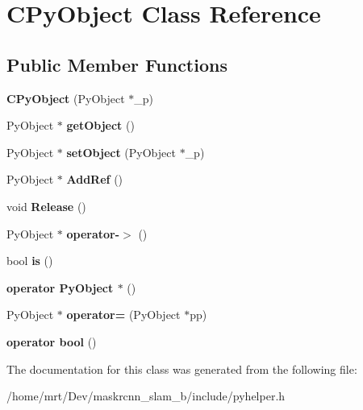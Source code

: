 \hypertarget{classCPyObject}{}\section{C\+Py\+Object Class Reference}
\label{classCPyObject}
\subsection*{Public Member Functions}
\begin{DoxyCompactItemize}
\item 
{\bfseries C\+Py\+Object} (Py\+Object $\ast$\+\_\+p)\hypertarget{classCPyObject_ab0879ae04f36d0c2bde91fac93172f0d}{}\label{classCPyObject_ab0879ae04f36d0c2bde91fac93172f0d}

\item 
Py\+Object $\ast$ {\bfseries get\+Object} ()\hypertarget{classCPyObject_a3f66c0af575875b43705836d435cfca2}{}\label{classCPyObject_a3f66c0af575875b43705836d435cfca2}

\item 
Py\+Object $\ast$ {\bfseries set\+Object} (Py\+Object $\ast$\+\_\+p)\hypertarget{classCPyObject_a2076d0dedf1eaa03f4c8e3732d0eb784}{}\label{classCPyObject_a2076d0dedf1eaa03f4c8e3732d0eb784}

\item 
Py\+Object $\ast$ {\bfseries Add\+Ref} ()\hypertarget{classCPyObject_a7ef6b0d76d997a997f8ef52ece7b2032}{}\label{classCPyObject_a7ef6b0d76d997a997f8ef52ece7b2032}

\item 
void {\bfseries Release} ()\hypertarget{classCPyObject_af10eb4a211c489f7cbdf3ead1ae54502}{}\label{classCPyObject_af10eb4a211c489f7cbdf3ead1ae54502}

\item 
Py\+Object $\ast$ {\bfseries operator-\/$>$} ()\hypertarget{classCPyObject_a16862e32d5a8cf461627a92bfbccca56}{}\label{classCPyObject_a16862e32d5a8cf461627a92bfbccca56}

\item 
bool {\bfseries is} ()\hypertarget{classCPyObject_a5194ed03c277782e2de122aaaf44111f}{}\label{classCPyObject_a5194ed03c277782e2de122aaaf44111f}

\item 
{\bfseries operator Py\+Object $\ast$} ()\hypertarget{classCPyObject_acbf3d2c5d9a611f9afff168df4f6de4c}{}\label{classCPyObject_acbf3d2c5d9a611f9afff168df4f6de4c}

\item 
Py\+Object $\ast$ {\bfseries operator=} (Py\+Object $\ast$pp)\hypertarget{classCPyObject_a1ad4db3b7645d1da146ef7dab6aee968}{}\label{classCPyObject_a1ad4db3b7645d1da146ef7dab6aee968}

\item 
{\bfseries operator bool} ()\hypertarget{classCPyObject_afe117811ae58ce8842bd36ba68888362}{}\label{classCPyObject_afe117811ae58ce8842bd36ba68888362}

\end{DoxyCompactItemize}


The documentation for this class was generated from the following file\+:\begin{DoxyCompactItemize}
\item 
/home/mrt/\+Dev/maskrcnn\+\_\+slam\+\_\+b/include/pyhelper.\+h\end{DoxyCompactItemize}
